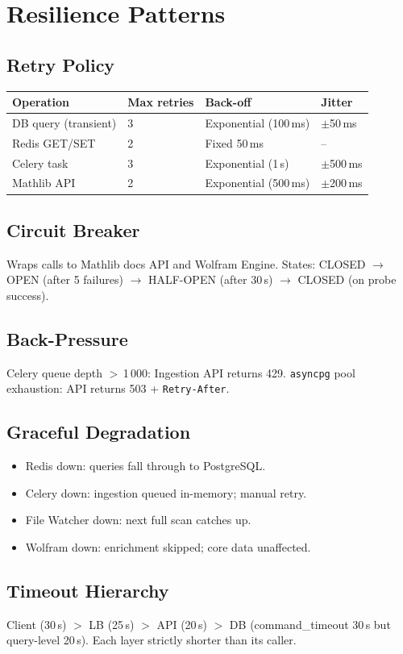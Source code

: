 \chapter{Resilience Patterns}

\section{Retry Policy}
\begin{table}[h]
\centering
\begin{tabular}{@{}llll@{}}
\toprule
\textbf{Operation} & \textbf{Max retries} & \textbf{Back-off} & \textbf{Jitter} \\
\midrule
DB query (transient) & 3 & Exponential (100\,ms) & $\pm$50\,ms \\
Redis GET/SET        & 2 & Fixed 50\,ms          & -- \\
Celery task          & 3 & Exponential (1\,s)    & $\pm$500\,ms \\
Mathlib API          & 2 & Exponential (500\,ms) & $\pm$200\,ms \\
\bottomrule
\end{tabular}
\end{table}

\section{Circuit Breaker}
Wraps calls to Mathlib docs API and Wolfram Engine.
States: CLOSED $\to$ OPEN (after 5 failures) $\to$ HALF-OPEN (after 30\,s)
$\to$ CLOSED (on probe success).

\section{Back-Pressure}
Celery queue depth $>$\,1\,000: Ingestion API returns 429.
\texttt{asyncpg} pool exhaustion: API returns 503 + \texttt{Retry-After}.

\section{Graceful Degradation}
\begin{itemize}
  \item Redis down: queries fall through to PostgreSQL.
  \item Celery down: ingestion queued in-memory; manual retry.
  \item File Watcher down: next full scan catches up.
  \item Wolfram down: enrichment skipped; core data unaffected.
\end{itemize}

\section{Timeout Hierarchy}
Client (30\,s) $>$ LB (25\,s) $>$ API (20\,s) $>$ DB (command\_timeout 30\,s
but query-level 20\,s).  Each layer strictly shorter than its caller.
